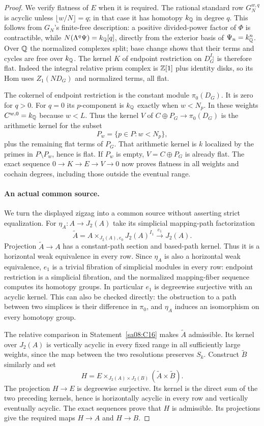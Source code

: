 \begin{proof}
We verify flatness of $E$ when it is required. The rational standard
row $G_N^{w,q}$ is acyclic unless $\lfloor w/N\rfloor=q$; in that
case it has homotopy $k_{\mathbb Q}$ in degree $q$. This follows from
$G_N$'s finite-free description: a positive divided-power factor
of $\Phi$ is contractible, while
$N(\Lambda^q\Psi)=k_{\mathbb Q}[q]$, directly from the exterior basis
of $\Psi_n=k_{\mathbb Q}^n$. Over $\mathbb Q$ the normalized complexes split;
base change shows that their terms and cycles are free over
$k_{\mathbb Q}$. The kernel $K$ of endpoint restriction on $D_G^{I_1}$
is therefore flat. Indeed the integral relative prism complex is
$\mathbb Z[1]$ plus identity disks, so its Hom uses $Z_1(ND_G)$ and
normalized terms, all flat.

The cokernel of endpoint restriction is the constant module
$\pi_0(D_G)$. It is zero for $q>0$. For $q=0$ its $p$-component
is $k_{\mathbb Q}$ exactly when $w<N_p$. In these weights $C^{w,0}=k_{\mathbb Q}$
because $w<L$. Thus the kernel $V$ of
$C\oplus P_G\to\pi_0(D_G)$ is the arithmetic kernel for the subset
\[
 P_w=\{p\in P:w<N_p\},
\]
plus the remaining flat terms of $P_G$. That arithmetic kernel
is $k$ localized by the primes in $P\setminus P_w$, hence is flat.
If $P_w$ is empty, $V=C\oplus P_G$ is already flat. The exact
sequence $0\to K\to E\to V\to0$ now proves flatness in all weights
and cochain degrees, including those outside the eventual range.

\paragraph{An actual common source.}
We turn the displayed zigzag into a common source without asserting
strict equalization. For $\eta_A:A\to J_2(A)$ take its simplicial
mapping-path factorization
\[
 \widetilde A=A\mathop{\times}_{J_2(A),e_0}J_2(A)^{I_1}
 \xrightarrow{e_1}J_2(A).
\]
Projection $\widetilde A\to A$ has a constant-path section and
based-path kernel. Thus it is a horizontal weak equivalence in
every row. Since $\eta_A$ is also a horizontal weak equivalence,
$e_1$ is a trivial fibration of simplicial modules in every row:
endpoint restriction is a simplicial fibration, and the normalized
mapping-fiber sequence computes its homotopy groups. In particular
$e_1$ is degreewise surjective with an acyclic kernel. This can
also be checked directly: the obstruction to a path between two
simplices is their difference in $\pi_0$, and $\eta_A$ induces
an isomorphism on every homotopy group.

The relative comparison in Statement~\ref{sa08:C16} makes
$\widetilde A$ admissible. Its kernel over $J_2(A)$ is vertically
acyclic in every fixed range in all sufficiently large weights,
since the map between the two resolutions preserves $S_k$.
Construct $\widetilde B$ similarly and set
\[
 H=E\mathop{\times}_{J_2(A)\times J_2(B)}
       (\widetilde A\times\widetilde B).
\]
The projection $H\to E$ is degreewise surjective. Its kernel is
the direct sum of the two preceding kernels, hence is horizontally
acyclic in every row and vertically eventually acyclic. The exact
sequences prove that $H$ is admissible. Its projections give the
required maps $H\to A$ and $H\to B$.


\end{proof}
